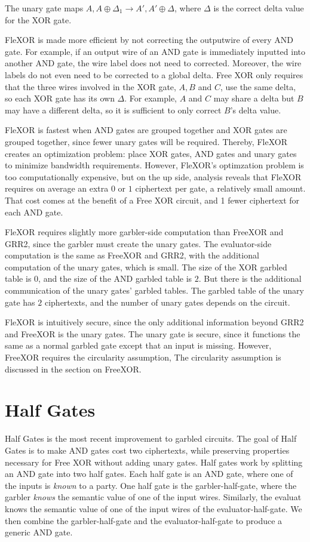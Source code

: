 The unary gate maps $A,A \oplus \Delta_1 \to A', A' \oplus \Delta$, where $\Delta$ is the correct delta value for the XOR gate.

FleXOR is made more efficient by not correcting the outputwire of every AND gate.
For example, if an output wire of an AND gate is immediately inputted into another AND gate, the wire label does not need to corrected.
Moreover, the wire labels do not even need to be corrected to a global delta.
Free XOR only requires that the three wires involved in the XOR gate, $A, B$ and $C$, use the same delta, so each XOR gate has its own $\Delta$.
For example, $A$ and $C$ may share a delta but $B$ may have a different delta, so it is sufficient to only correct $B$'s delta value.

FleXOR is fastest when AND gates are grouped together and XOR gates are grouped together, since fewer unary gates will be required.
Thereby, FleXOR creates an optimization problem: place XOR gates, AND gates and unary gates to minimize bandwidth requirements.
However, FleXOR's optimzation problem is too computationally expensive, but on the up side, analysis reveals that FleXOR requires on average an extra $0$ or $1$ ciphertext per gate, a relatively small amount.
That cost comes at the benefit of a Free XOR circuit, and 1 fewer ciphertext for each AND gate.

FleXOR requires slightly more garbler-side computation than FreeXOR and GRR2, since the garbler must create the unary gates.
The evaluator-side computation is the same as FreeXOR and GRR2, with the additional computation of the unary gates, which is small.
The size of the XOR garbled table is $0$, and the size of the AND garbled table is $2$.
But there is the additional communication of the unary gates' garbled tables.
The garbled table of the unary gate has $2$ ciphertexts, and the number of unary gates depends on the circuit.

FleXOR is intuitively secure, since the only additional information beyond GRR2 and FreeXOR is the unary gates.
The unary gate is secure, since it functions the same as a normal garbled gate except that an input is missing.
However, FreeXOR requires the circularity assumption, 
The circularity assumption is discussed in the section on FreeXOR.

\section{Half Gates}
Half Gates is the most recent improvement to garbled circuits.
The goal of Half Gates is to make AND gates cost two ciphertexts, while preserving properties necessary for Free XOR without adding unary gates. 
Half gates work by splitting an AND gate into two half gates.
Each half gate is an AND gate, where one of the inputs is \textit{known} to a party.
One half gate is the garbler-half-gate, where the garbler \textit{knows} the semantic value of one of the input wires.
Similarly, the evaluat knows the semantic value of one of the input wires of the evaluator-half-gate.
We then combine the garbler-half-gate and the evaluator-half-gate to produce a generic AND gate.

